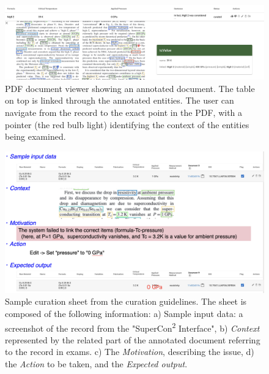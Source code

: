 \documentclass[]{interact}
\theoremstyle{plain} %
\theoremstyle{definition}
\theoremstyle{remark}
\begin{document}
\begin{figure}[ht]
  \centering
  \includegraphics[width=1\textwidth]{images/pdf-view-context.png} 
  \caption{PDF document viewer showing an annotated document. The table on top is linked through the annotated entities. The user can navigate from the record to the exact point in the PDF, with a pointer (the red bulb light) identifying the context of the entities being examined. }
  \label{fig:pdf-view}
\end{figure}


\begin{figure}[ht]
  \centering
  \includegraphics[width=1\textwidth]{images/example-sheet-curation.png} 
  \caption{Sample curation sheet from the curation guidelines. The sheet is composed of the following information: a) {Sample input data}: a screenshot of the record from the "SuperCon\textsuperscript{2} Interface", b) \textit{Context} represented by the related part of the annotated document referring to the record in exams. c) The \textit{Motivation}, describing the issue, d) the \textit{Action} to be taken, and the \textit{Expected output}.
 }
  \label{fig:example-curation-sheet}
\end{figure}
\end{document}
